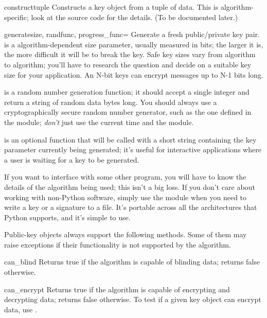 \documentclass{howto}
\begin{document}
\begin{funcdesc}{construct}{tuple}
Constructs a key object from a tuple of data.  This is
algorithm-specific; look at the source code for the details.  (To be
documented later.)
\end{funcdesc}

\begin{funcdesc}{generate}{size, randfunc, progress_func=}
Generate a fresh public/private key pair.   is a
algorithm-dependent size parameter, usually measured in bits; the
larger it is, the more difficult it will be to break the key.  Safe
key sizes vary from algorithm to algorithm; you'll have to research
the question and decide on a suitable key size for your application.
An N-bit keys can encrypt messages up to N-1 bits long.

 is a random number generation function; it should
accept a single integer  and return a string of random data
 bytes long.  You should always use a cryptographically secure
random number generator, such as the one defined in the
 module; \emph{don't} just use the
current time and the  module.

 is an optional function that will be called with a short
string containing the key parameter currently being generated; it's
useful for interactive applications where a user is waiting for a key
to be generated.
\end{funcdesc}

If you want to interface with some other program, you will have to know
the details of the algorithm being used; this isn't a big loss.  If you
don't care about working with non-Python software, simply use the
 module when you need to write a key or a signature to a
file.  It's portable across all the architectures that Python supports,
and it's simple to use.

Public-key objects always support the following methods.  Some of them
may raise exceptions if their functionality is not supported by the
algorithm.

\begin{methoddesc}{can_blind}{}
Returns true if the algorithm is capable of blinding data;
returns false otherwise.
\end{methoddesc}

\begin{methoddesc}{can_encrypt}{}
Returns true if the algorithm is capable of encrypting and decrypting
data; returns false otherwise.  To test if a given key object can encrypt
data, use .
\end{methoddesc}
\end{document}
